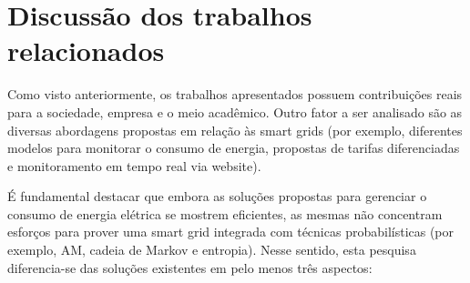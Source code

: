 \chapter{Discussão dos trabalhos relacionados}
Como visto anteriormente, os trabalhos apresentados possuem contribuições reais para a sociedade, empresa e o meio acadêmico. Outro fator a ser analisado são as diversas abordagens propostas em relação às smart grids (por exemplo, diferentes modelos para monitorar o consumo de energia, propostas de tarifas diferenciadas e monitoramento em tempo real via website). 

É fundamental destacar que embora as soluções propostas para gerenciar o consumo de energia elétrica se mostrem eficientes, as mesmas não concentram esforços para prover uma smart grid integrada com técnicas probabilísticas (por exemplo, AM, cadeia de Markov e entropia). Nesse sentido, esta pesquisa diferencia-se das soluções existentes em pelo menos três aspectos: